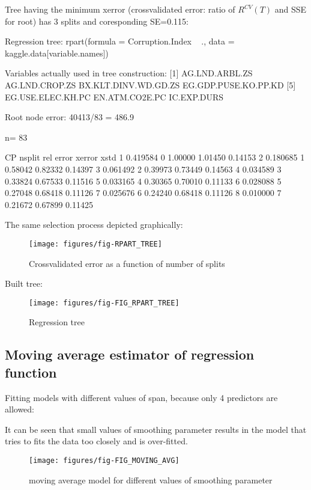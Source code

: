 \documentclass[a4paper]{article}
\begin{document}
Tree having the minimum xerror (crossvalidated error: ratio of $R^{CV}(T)$ and
SSE for root) has 3 splits
and coresponding SE=0.115:
\begin{Schunk}
\begin{Soutput}
Regression tree:
rpart(formula = Corruption.Index ~ ., data = kaggle.data[variable.names])

Variables actually used in tree construction:
[1] AG.LND.ARBL.ZS       AG.LND.CROP.ZS       BX.KLT.DINV.WD.GD.ZS EG.GDP.PUSE.KO.PP.KD
[5] EG.USE.ELEC.KH.PC    EN.ATM.CO2E.PC       IC.EXP.DURS         

Root node error: 40413/83 = 486.9

n= 83 

        CP nsplit rel error  xerror    xstd
1 0.419584      0   1.00000 1.01450 0.14153
2 0.180685      1   0.58042 0.82332 0.14397
3 0.061492      2   0.39973 0.73449 0.14563
4 0.034589      3   0.33824 0.67533 0.11516
5 0.033165      4   0.30365 0.70010 0.11133
6 0.028088      5   0.27048 0.68418 0.11126
7 0.025676      6   0.24240 0.68418 0.11126
8 0.010000      7   0.21672 0.67899 0.11425
\end{Soutput}
\end{Schunk}
The same selection process depicted graphically:
\begin{figure}[H]
\begin{center}
\texttt{[image: figures/fig-RPART\_TREE]}
\caption{Crossvalidated error as a function of number of splits}
\end{center}
\end{figure}

Built tree:
\begin{figure}[H]
\begin{center}
\texttt{[image: figures/fig-FIG\_RPART\_TREE]}
\caption{Regression tree}
\end{center}
\end{figure}

\subsection{Moving average estimator of regression function}
 Fitting models with different values of span, because only 4 predictors are
 allowed:

It can be seen that small values of smoothing parameter results in the model
that tries to fits the data too closely and is over-fitted. 
\begin{figure}[H]
\begin{center}
\texttt{[image: figures/fig-FIG\_MOVING\_AVG]}
\caption{moving average model for different values of smoothing parameter}
\end{center}
\end{figure}
\end{document}
